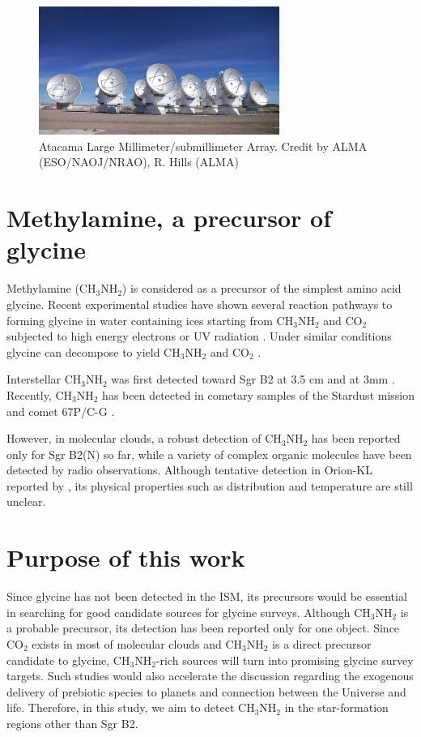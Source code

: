 \begin{figure}[H]
  \centering
  \includegraphics[width=0.7\textwidth]{ALMA.eps}
  \caption{Atacama Large Millimeter/submillimeter Array. Credit by ALMA (ESO/NAOJ/NRAO), R. Hills (ALMA)}
\end{figure}

\newpage
\section{Methylamine, a precursor of glycine}
Methylamine (CH$_3$NH$_2$) is considered as a precursor of the simplest amino acid glycine. 
Recent experimental studies have shown several reaction pathways to forming
glycine in water containing ices starting from CH$_3$NH$_2$ and CO$_2$
subjected to high energy electrons \citep{Holtom+2005} or UV radiation \citep{Bossa+2009, Lee+2009}. Under similar conditions glycine can decompose to yield CH$_3$NH$_2$ and CO$_2$
\citep{Ehrenfreund+2001}. 

Interstellar CH$_3$NH$_2$ was first detected toward Sgr B2 at 3.5 cm \citep{Fourikis+1974} 
and at 3mm \citep{Kaifu+1974}. Recently, CH$_3$NH$_2$ has been detected 
in cometary samples of the Stardust mission \citep{Glavin+2008} and comet 67P/C-G \citep{Altwegg+2016, Altwegg+2017}.

However, in molecular clouds, 
a robust detection of CH$_3$NH$_2$ has been reported only for Sgr B2(N) \citep{Halfen+2013}  so far, 
while a variety of complex organic molecules have been detected by radio observations.
Although tentative detection in Orion-KL reported by \citet{Pagani+2017}, its physical properties 
such as distribution and temperature are still unclear.

\newpage
\section{Purpose of this work}
Since glycine has not been detected in the ISM, its precursors would be essential in
searching for good candidate sources for glycine surveys. 
Although CH$_3$NH$_2$  is a probable precursor, its detection has been reported only for one object. 
Since CO$_2$ exists in most of molecular clouds and CH$_3$NH$_2$ is a direct precursor
candidate to glycine, CH$_3$NH$_2$-rich sources will turn into promising glycine survey targets. 
Such studies would also accelerate the discussion regarding the exogenous delivery of 
prebiotic species to planets and connection between the Universe and life.
Therefore, in this study, we aim to detect CH$_3$NH$_2$ in the star-formation regions other than Sgr B2.

